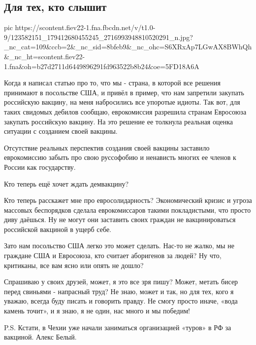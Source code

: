  
 
 

\subsection{Для тех, кто слышит}
\label{sec:06_11_2020.fb.alex_belyy.1.kovid_vaccine}

\ifcmt
pic https://scontent.fiev22-1.fna.fbcdn.net/v/t1.0-9/123582151_179412680455245_2716993948810520291_n.jpg?_nc_cat=109&ccb=2&_nc_sid=8bfeb9&_nc_ohc=S6XRxAp7LGwAX8BWhQh&_nc_ht=scontent.fiev22-1.fna&oh=b27d2711d6449896291fd963522b8b24&oe=5FD18A6A
\fi

Когда я написал статью про то, что мы - страна, в которой все решения принимают
в посольстве США, и привёл в пример, что нам запретили закупать российскую
вакцину, на меня набросились все упоротые идиоты. Так вот, для таких свидомых
дебилов сообщаю, еврокомиссия разрешила странам Евросоюза  закупать российскую
вакцину. На это решение ее толкнула реальная оценка ситуации с созданием своей
вакцины. 

Отсутствие реальных перспектив создания своей вакцины заставило еврокомиссию
забыть про свою руссофобию и ненависть многих ее членов к России как
государству. 

Кто теперь ещё хочет ждать демвакцину? 

Кто теперь расскажет мне про  евросолидарность? Экономический кризис и угроза
массовых беспорядков сделала еврокомиссаров такими покладистыми, что просто
диву даёшься. Ну не могут они заставить своих граждан не вакцинироваться
российской вакциной в ущерб себе. 

Зато нам посольство США легко это может сделать. Нас-то не жалко, мы не
граждане США  и Евросоюза, кто считает аборигенов за людей? Ну что, критиканы,
все вам ясно или опять не дошло? 

Спрашиваю у своих друзей, может, я это все зря пишу? Может, метать бисер перед
свиньями - напрасный труд? Не знаю, может и так, но для тех, кого я уважаю,
всегда буду писать и говорить правду. Не смогу просто иначе, «вода камень
точит», и я знаю, я не один, нас много и мы победим!

P.S. Кстати, в Чехии уже начали заниматься организацией «туров» в РФ за
вакциной.  Алекс Белый.
